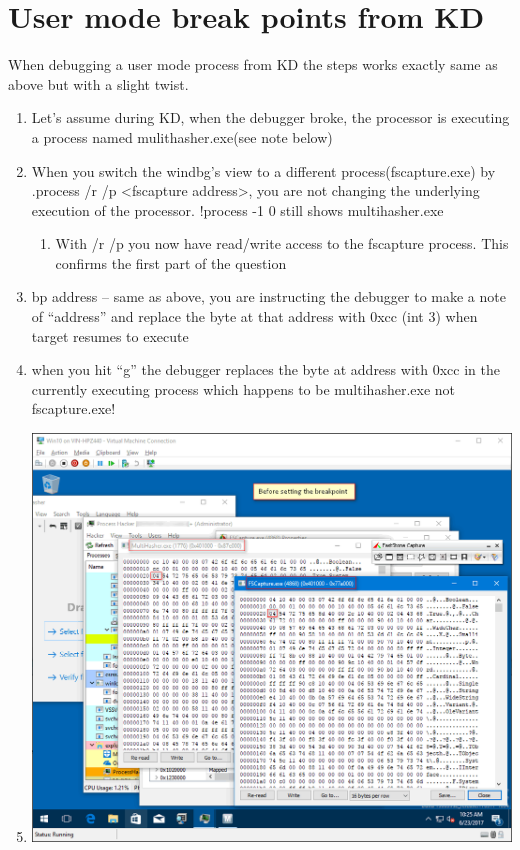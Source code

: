 \documentclass{article}
\begin{document}
\section{User mode break points from KD}
When debugging a user mode process from KD the steps works exactly same as above but with a slight twist.
\begin{enumerate}[noitemsep]
    \item Let’s assume during KD, when the debugger broke, the processor is executing a process named mulithasher.exe(see note below)
    \item When you switch the windbg’s view to a different process(fscapture.exe) by .process /r /p <fscapture address>, you are not changing the underlying execution of the processor. !process -1 0 still shows multihasher.exe
    \begin{enumerate}[noitemsep]
    \item With /r /p you now have read/write access to the fscapture process. This confirms the first part of the question
    \end{enumerate}
    \item bp address  – same as above, you are instructing the debugger to make a note of “address” and replace the byte at that address with 0xcc (int 3) when target resumes to execute
    \item when you hit “g” the debugger replaces the byte at address with 0xcc in the currently executing process which happens to be multihasher.exe not fscapture.exe!

    \item
    \begin{minipage}{\linewidth}
    \includegraphics[width=\linewidth]{UsermodeBreakPointFromKD1.png}
    \end{minipage}


\end{enumerate}
\end{document}
